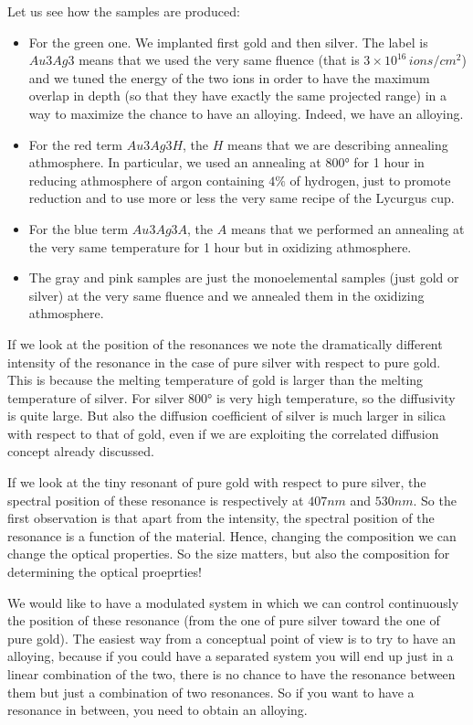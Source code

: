 \documentclass[../main/main.tex]{subfiles}
\begin{document}
Let us see how the samples are produced:
\begin{itemize}
\item For the green one. We implanted first gold and then silver. The label is \( Au3Ag3 \) means that we used the very same fluence (that is \( 3 \times 10^{16} \, ions/cm^2\)) and we tuned the energy of the two ions in order to have the maximum overlap in depth (so that they have exactly the same projected range) in a way to maximize the chance to have an alloying. Indeed, we have an alloying.

\item For the red term \( Au3Ag3H \), the \( H \) means that we are describing annealing athmosphere. In particular, we used an annealing at \( 800° \) for 1 hour in reducing athmosphere of argon containing \( 4\% \) of hydrogen, just to promote reduction and to use more or less the very same recipe of the Lycurgus cup.

\item For the blue term \( Au3Ag3A \), the \( A \) means that we performed an annealing at the very same temperature for 1 hour but in oxidizing athmosphere.

\item The gray and pink samples are just the monoelemental samples (just gold or silver) at the very same fluence and we annealed them in the oxidizing athmosphere.
\end{itemize}
If we look at the position of the resonances we note the dramatically different intensity of the resonance in the case of pure silver with respect to pure gold.
This is because the melting temperature of gold is larger than the melting temperature of silver. For silver \( 800° \) is very high temperature, so the diffusivity is quite large. But also the diffusion coefficient of silver is much larger in silica with respect to that of gold, even if we are exploiting the correlated diffusion concept already discussed.

If we look at the tiny resonant of pure gold with respect to pure silver, the spectral position of these resonance is respectively at \( 407nm \) and \( 530nm \).
So the first observation is that apart from the intensity, the spectral position of the resonance is a function of the material. Hence, changing the composition we can change the optical properties.
So the size matters, but also the composition for determining the optical proeprties!

We would like to have a modulated system in which we can control continuously the position of these resonance (from the one of pure silver toward the one of pure gold). The easiest way from a conceptual point of view is to try to have an alloying, because if you could have a separated system you will end up just in a linear combination of the two, there is no chance to have the resonance between them but just a combination of two resonances.
So if you want to have a resonance in between, you need to obtain an alloying.
\end{document}
